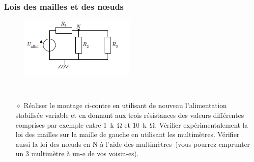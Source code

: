 \documentclass[../main/main.tex]{subfiles}
\begin{document}
\subsubsection{Lois des mailles et des nœuds}
\begin{figure}
	\centering
	\includegraphics[width=\linewidth]{ldmn}
\end{figure}
~\vspace{-20pt}
\begin{enumerate}
	\item[$\diamond$] Réaliser le montage ci-contre en utilisant de nouveau l'alimentation
		stabilisée variable et en donnant aux trois résistances des valeurs
		différentes comprises par exemple entre \SI{1}{k\ohm} et \SI{10}{k\ohm}.
		\sqitem[2] Vérifier expérimentalement la loi des mailles sur la maille de gauche
		en utilisant les multimètres.
		\sqitem[3] Vérifier aussi la loi des nœuds en N à l'aide des multimètres~(vous
		pourrez emprunter un 3\ieme{} multimètre à un-e de vos voisin-es).
\end{enumerate}
\end{document}

